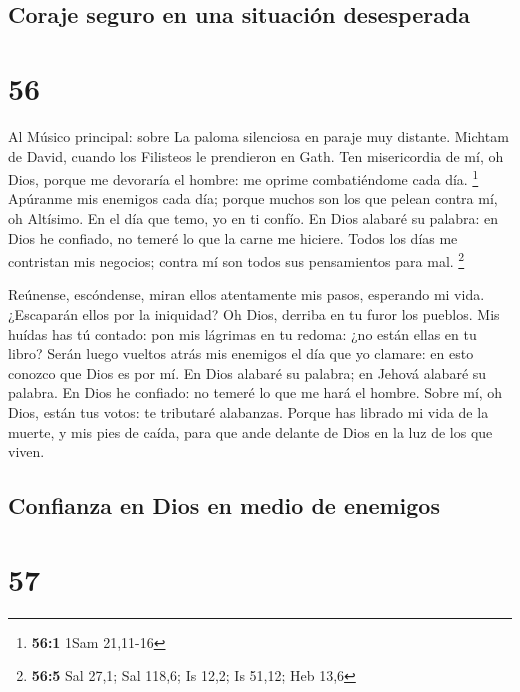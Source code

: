 \hypertarget{coraje-seguro-en-una-situaciuxf3n-desesperada}{%
\subsection{Coraje seguro en una situación
desesperada}\label{coraje-seguro-en-una-situaciuxf3n-desesperada}}

\hypertarget{section-55}{%
\section{56}\label{section-55}}

 Al Músico principal: sobre La paloma silenciosa en paraje
muy distante. Michtam de David, cuando los Filisteos le prendieron en
Gath. Ten misericordia de mí, oh Dios, porque me devoraría el hombre: me
oprime combatiéndome cada día. \footnote{\textbf{56:1} 1Sam 21,11-16}
 Apúranme mis enemigos cada día; porque muchos son los que
pelean contra mí, oh Altísimo.  En el día que temo, yo en ti
confío.  En Dios alabaré su palabra: en Dios he confiado, no
temeré lo que la carne me hiciere.  Todos los días me
contristan mis negocios; contra mí son todos sus pensamientos para mal.
\footnote{\textbf{56:5} Sal 27,1; Sal 118,6; Is 12,2; Is 51,12; Heb 13,6}

 Reúnense, escóndense, miran ellos atentamente mis pasos,
esperando mi vida.  ¿Escaparán ellos por la iniquidad? Oh
Dios, derriba en tu furor los pueblos.  Mis huídas has tú
contado: pon mis lágrimas en tu redoma: ¿no están ellas en tu libro?
 Serán luego vueltos atrás mis enemigos el día que yo
clamare: en esto conozco que Dios es por mí.  En Dios
alabaré su palabra; en Jehová alabaré su palabra.  En Dios
he confiado: no temeré lo que me hará el hombre.  Sobre mí,
oh Dios, están tus votos: te tributaré alabanzas.  Porque
has librado mi vida de la muerte, y mis pies de caída, para que ande
delante de Dios en la luz de los que viven.

\hypertarget{confianza-en-dios-en-medio-de-enemigos}{%
\subsection{Confianza en Dios en medio de
enemigos}\label{confianza-en-dios-en-medio-de-enemigos}}

\hypertarget{section-56}{%
\section{57}\label{section-56}}

